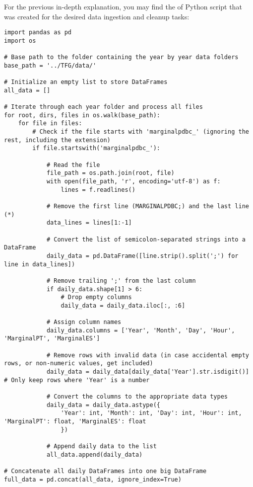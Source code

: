 \documentclass[12pt]{report} %
\begin{document}
For the previous in-depth explanation, you may find the of Python script that was created for the desired data ingestion and cleanup tasks:
\begin{lstlisting}
import pandas as pd
import os

# Base path to the folder containing the year by year data folders
base_path = '../TFG/data/'

# Initialize an empty list to store DataFrames
all_data = []

# Iterate through each year folder and process all files
for root, dirs, files in os.walk(base_path):
    for file in files:
        # Check if the file starts with 'marginalpdbc_' (ignoring the rest, including the extension)
        if file.startswith('marginalpdbc_'):
            
            # Read the file
            file_path = os.path.join(root, file)
            with open(file_path, 'r', encoding='utf-8') as f:
                lines = f.readlines()

            # Remove the first line (MARGINALPDBC;) and the last line (*)
            data_lines = lines[1:-1]
            
            # Convert the list of semicolon-separated strings into a DataFrame
            daily_data = pd.DataFrame([line.strip().split(';') for line in data_lines])
            
            # Remove trailing ';' from the last column
            if daily_data.shape[1] > 6:
                # Drop empty columns
                daily_data = daily_data.iloc[:, :6]
            
            # Assign column names
            daily_data.columns = ['Year', 'Month', 'Day', 'Hour', 'MarginalPT', 'MarginalES']
            
            # Remove rows with invalid data (in case accidental empty rows, or non-numeric values, get included)
            daily_data = daily_data[daily_data['Year'].str.isdigit()]  # Only keep rows where 'Year' is a number
            
            # Convert the columns to the appropriate data types
            daily_data = daily_data.astype({
                'Year': int, 'Month': int, 'Day': int, 'Hour': int, 'MarginalPT': float, 'MarginalES': float
                })
            
            # Append daily data to the list
            all_data.append(daily_data)

# Concatenate all daily DataFrames into one big DataFrame
full_data = pd.concat(all_data, ignore_index=True)


\end{lstlisting}
\end{document}
